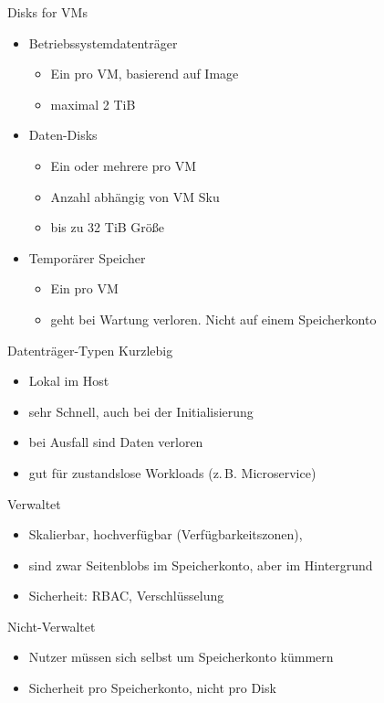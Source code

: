 \begin{flashcard}[Definition]{Disks for VMs}
    \begin{itemize}
        \item Betriebssystemdatenträger
            \begin{itemize}
                \item Ein pro VM, basierend auf Image
                \item maximal 2 TiB
            \end{itemize}

        \item Daten-Disks
            \begin{itemize}
                \item Ein oder mehrere pro VM
                \item Anzahl abhängig von VM Sku
                \item bis zu 32 TiB Größe
            \end{itemize}

        \item Temporärer Speicher\newline
            \begin{itemize}
                \item Ein pro VM
                \item geht bei Wartung verloren. Nicht auf einem Speicherkonto
            \end{itemize}
    \end{itemize}
\end{flashcard}

\begin{flashcard}[Definition]{Datenträger-Typen}
    Kurzlebig
    \begin{itemize}
        \item Lokal im Host
        \item sehr Schnell, auch bei der Initialisierung
        \item bei Ausfall sind Daten verloren
        \item gut für zustandslose Workloads (z.\,B. Microservice)
    \end{itemize}
    Verwaltet
    \begin{itemize}
        \item Skalierbar, hochverfügbar (Verfügbarkeitszonen),
        \item sind zwar Seitenblobs im Speicherkonto, aber im Hintergrund
        \item Sicherheit: RBAC, Verschlüsselung
    \end{itemize}
    Nicht-Verwaltet
    \begin{itemize}
        \item Nutzer müssen sich selbst um Speicherkonto kümmern
        \item Sicherheit pro Speicherkonto, nicht pro Disk
    \end{itemize}
\end{flashcard}

